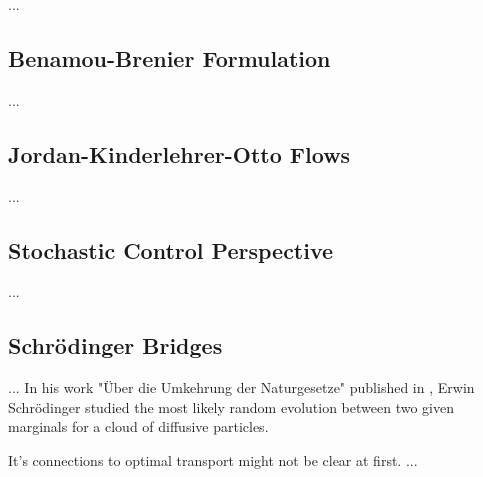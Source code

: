 ...

\subsection{Benamou-Brenier Formulation} \label{sec:background_benamou_brenier}

...

\subsection{Jordan-Kinderlehrer-Otto Flows} \label{sec:background_jko}

...

\subsection{Stochastic Control Perspective} \label{sec:background_control}

...

\subsection{Schr{\"o}dinger Bridges} \label{sec:background_sb}

...
In his work "{\"U}ber die Umkehrung der Naturgesetze" published in \citeyear{schrodinger1931umkehrung}, Erwin Schr{\"o}dinger studied the most likely random evolution between two given marginals for a cloud of diffusive particles.

It's connections to optimal transport might not be clear at first. ...



